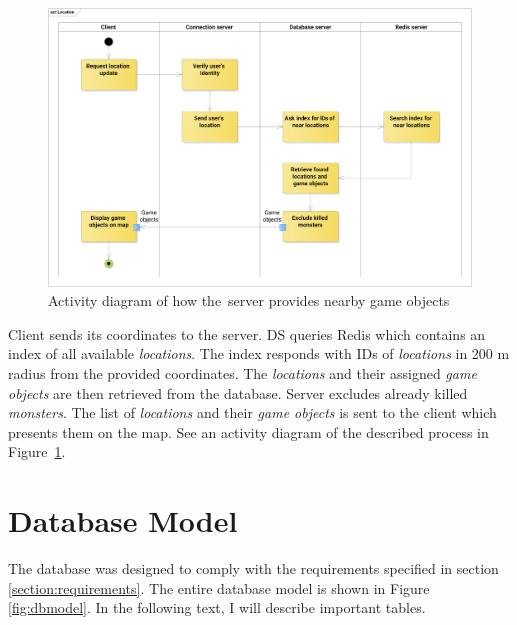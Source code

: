	\begin{figure}[h]	
		\includegraphics[width=\textwidth]{figures/AD_Location}
		\centering			
		\caption{Activity diagram of how the~server provides nearby game objects}
		\label{fig:adlocation}
	\end{figure} 
	
	Client sends its coordinates to the server. DS queries Redis which contains an index of all available \textit{locations}. The index responds with IDs of \textit{locations} in 200 m radius from the provided coordinates. The \textit{locations} and their assigned \textit{game objects} are then retrieved from the database. Server excludes already killed \textit{monsters}. The list of \textit{locations} and their \textit{game objects} is sent to the client which presents them on the map. See an activity diagram of the described process in Figure~\ref{fig:adlocation}.		

\section{Database Model}
	The database was designed to comply with the requirements specified in section \ref{section:requirements}. The entire database model is shown in Figure \ref{fig:dbmodel}. In the following text, I will describe important tables.	
	
